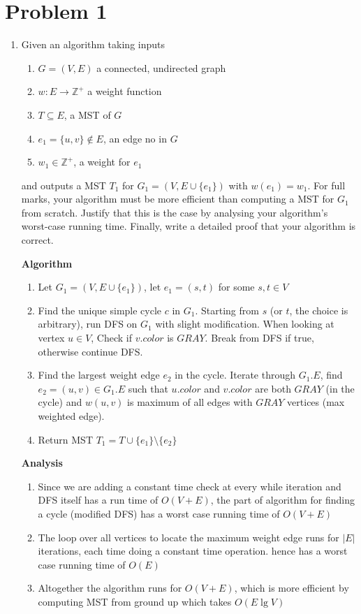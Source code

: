 \documentclass[11pt]{article}
\begin{document}
\section*{Problem 1}

\begin{enumerate}
    \item 
    Given an algorithm taking inputs
    \begin{enumerate}
        \item $G = (V,E)$ a connected, undirected graph 
        \item $w: E\to \mathbb{Z}^+$ a weight function 
        \item $T \subseteq E$, a MST of $G$
        \item $e_1 = \{u,v\} \not\in E$, an edge no in $G$ 
        \item $w_1 \in \mathbb{Z}^+$, a weight for $e_1$
    \end{enumerate}
    and outputs a MST $T_1$ for $G_1 = (V, E\cup \{ e_1 \})$ with $w(e_1) = w_1$. For full marks, your algorithm must be more efficient than computing a MST for $G_1$ from scratch. Justify that this is the case by analysing your algorithm’s worst-case running time. Finally, write a detailed proof that your algorithm is correct. 


    \begin{solution}
        \textbf{Algorithm}
        \begin{enumerate}
            \item Let $G_1 = (V, E\cup \{ e_1 \})$, let $e_1 = (s,t)$ for some $s,t\in V$ 
            \item Find the unique simple cycle $c$ in $G_1$. Starting from $s$ (or $t$, the choice is arbitrary), run DFS on $G_1$ with slight modification. When looking at vertex $u\in V$, Check if $v.color$ is $GRAY$. Break from DFS if true, otherwise continue DFS. 
            \item Find the largest weight edge $e_2$ in the cycle. Iterate through $G_1.E$, find $e_2 = (u,v)\in G_1.E$ such that $u.color$ and $v.color$ are both $GRAY$ (in the cycle) and $w(u,v)$ is maximum of all edges with $GRAY$ vertices (max weighted edge). 
            \item Return MST $T_1 = T \cup \{ e_1 \} \setminus \{e_2 \}$ 
        \end{enumerate}
        \textbf{Analysis} 
        \begin{enumerate}
            \item Since we are adding a constant time check at every while iteration and DFS itself has a run time of $O(V+E)$, the part of algorithm for finding a cycle (modified DFS) has a worst case running time of $O(V+E)$
            \item The loop over all vertices to locate the maximum weight edge runs for $|E|$ iterations, each time doing a constant time operation. hence has a worst case running time of $O(E)$
            \item Altogether the algorithm runs for $O(V+E)$, which is more efficient by computing MST from ground up which takes $O(E\lg V)$
        \end{enumerate}





\end{solution}
\end{enumerate}
\end{document}
